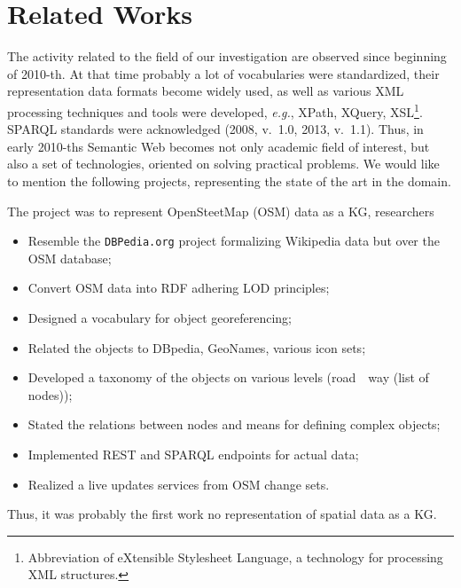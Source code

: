\documentclass[
]{ceurart}
\begin{document}
\section{Related Works}

The activity related to the field of our investigation are observed since beginning of 2010-th.  At that time probably a lot of vocabularies were standardized, their representation data formats become widely used, as well as various XML processing techniques and tools were developed, \emph{e.g.}, XPath, XQuery, XSL\footnote{Abbreviation of eXtensible Stylesheet Language, a technology for processing XML structures.}.  SPARQL standards were acknowledged (2008, v.~1.0, 2013, v.~1.1).  Thus, in early 2010-ths Semantic Web becomes not only academic field of interest, but also a set of technologies, oriented on solving practical problems. We would like to mention the following projects, representing the state of the art in the domain.

  The project \cite{lgd} was to represent OpenSteetMap (OSM) data as a KG, researchers
  \begin{itemize}
  \item Resemble the \texttt{DBPedia.org} project formalizing Wikipedia data but over the OSM database;
  \item Convert OSM data into RDF adhering LOD principles;
  \item Designed a vocabulary for object georeferencing;
  \item Related the objects to DBpedia, GeoNames, various icon sets;
  \item Developed a taxonomy of the objects on various levels (road~\to~way (list of nodes)); %
  \item Stated the relations between nodes and means for defining complex objects;
  \item Implemented REST and SPARQL endpoints for actual data;
  \item Realized a live updates services from OSM change sets.
  \end{itemize}
  Thus, it was probably the first work no representation of spatial data as a KG.
\end{document}
